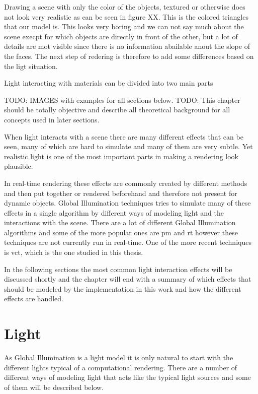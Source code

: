 Drawing a scene with only the color of the objects, textured or otherwise does not look very realistic as can be seen in figure XX. This is the colored triangles that our model is. This looks very boring and we can not say much about the scene execpt for which objects are directly in front of the other, but a lot of details are mot visible since there is no information abailable anout the slope of the faces. The next step of redering is therefore to add some differences based on the ligt situation. 

Light interacting with materials can be divided into two main parts 



TODO: IMAGES with examples for all sections below.
TODO: This chapter should be totally objective and describe all theoretical background for all concepts used in later sections. 

When light interacts with a scene there are many different effects that can be seen, many of which are hard to simulate and many of them are very subtle. Yet realistic light is one of the most important parts in making a rendering look plausible. 

In real-time rendering these effects are commonly created by different methods and then put together or rendered beforehand and therefore not present for dynamic objects. Global Illumination techniques tries to simulate many of these effects in a single algorithm by different ways of modeling light and the interactions with the scene. There are a lot of different Global Illumination algorithms and some of the more popular ones are \gls{pm} and \gls{rt} however these techniques are not currently run in real-time. One of the more recent techniques is \gls{vct}, which is the one studied in this thesis.

In the following sections the most common light interaction effects will be discussed shortly and the chapter will end with a summary of which effects that should be modeled by the implementation in this work and how the different effects are handled.

\section{Light}

As Global Illumination is a light model it is only natural to start with the different lights typical of a computational rendering. There are a number of different ways of modeling light that acts like the typical light sources and some of them will be described below. 

